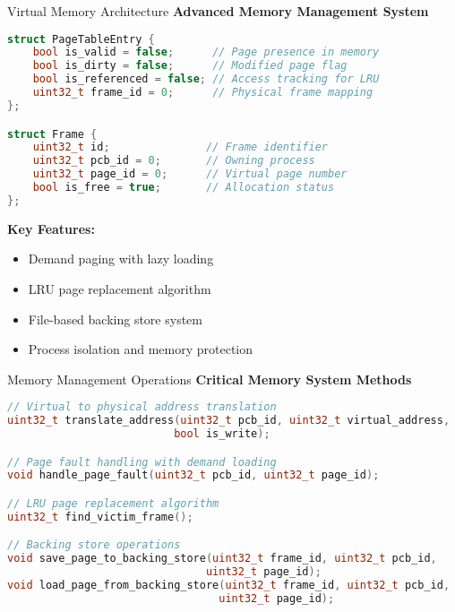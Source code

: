 \documentclass[10pt]{beamer}
\begin{document}
\begin{frame}[fragile]{Virtual Memory Architecture}
    \textbf{Advanced Memory Management System}
    \begin{lstlisting}[language=C++]
struct PageTableEntry {
    bool is_valid = false;      // Page presence in memory
    bool is_dirty = false;      // Modified page flag
    bool is_referenced = false; // Access tracking for LRU
    uint32_t frame_id = 0;      // Physical frame mapping
};

struct Frame {
    uint32_t id;               // Frame identifier
    uint32_t pcb_id = 0;       // Owning process
    uint32_t page_id = 0;      // Virtual page number
    bool is_free = true;       // Allocation status
};
    \end{lstlisting}
    
    \vspace{0.3cm}
    \textbf{Key Features:}
    \begin{itemize}
        \item Demand paging with lazy loading
        \item LRU page replacement algorithm
        \item File-based backing store system
        \item Process isolation and memory protection
    \end{itemize}
\end{frame}

\begin{frame}[fragile]{Memory Management Operations}
    \textbf{Critical Memory System Methods}
    \begin{lstlisting}[language=C++]
// Virtual to physical address translation
uint32_t translate_address(uint32_t pcb_id, uint32_t virtual_address, 
                          bool is_write);

// Page fault handling with demand loading
void handle_page_fault(uint32_t pcb_id, uint32_t page_id);

// LRU page replacement algorithm
uint32_t find_victim_frame();

// Backing store operations
void save_page_to_backing_store(uint32_t frame_id, uint32_t pcb_id, 
                               uint32_t page_id);
void load_page_from_backing_store(uint32_t frame_id, uint32_t pcb_id, 
                                 uint32_t page_id);
    \end{lstlisting}
\end{frame}
\end{document}

